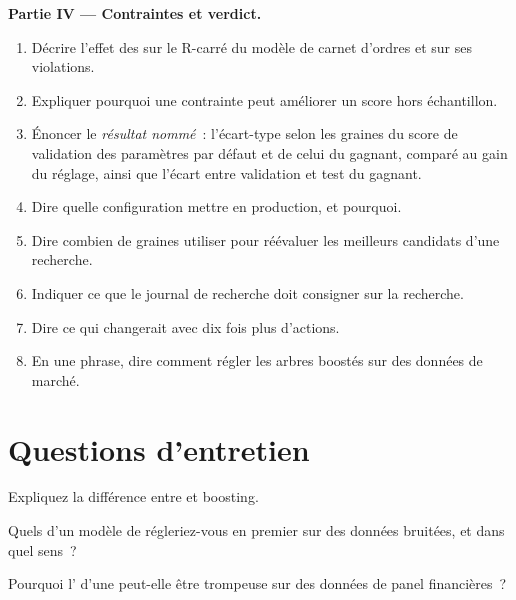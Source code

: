 \begin{problem}
\medskip\noindent\textbf{Partie IV --- Contraintes et verdict.}
\begin{enumerate}[resume]
\item Décrire l'effet des  sur le R-carré du modèle de carnet d'ordres et sur ses violations.
\item Expliquer pourquoi une contrainte peut améliorer un score hors échantillon.
\item Énoncer le \emph{résultat nommé}~: l'écart-type selon les graines du score de validation des paramètres par défaut et de celui du gagnant,
comparé au gain du réglage, ainsi que l'écart entre validation et test du gagnant.
\item Dire quelle configuration mettre en production, et pourquoi.
\item Dire combien de graines utiliser pour réévaluer les meilleurs candidats d'une recherche.
\item Indiquer ce que le journal de recherche doit consigner sur la recherche.
\item Dire ce qui changerait avec dix fois plus d'actions.
\item En une phrase, dire comment régler les arbres boostés sur des données de marché.
\end{enumerate}
\end{problem}

\section{Questions d'entretien}

\begin{interviewq}\label{iq:ml:trees-and-boosting:1}
Expliquez la différence entre  et boosting.
\end{interviewq}

\begin{interviewq}\label{iq:ml:trees-and-boosting:2}
Quels  d'un modèle de  régleriez-vous en premier sur des données bruitées, et dans quel sens~?
\end{interviewq}

\begin{interviewq}\label{iq:ml:trees-and-boosting:3}
Pourquoi l' d'une  peut-elle être trompeuse sur des données de panel financières~?
\end{interviewq}

